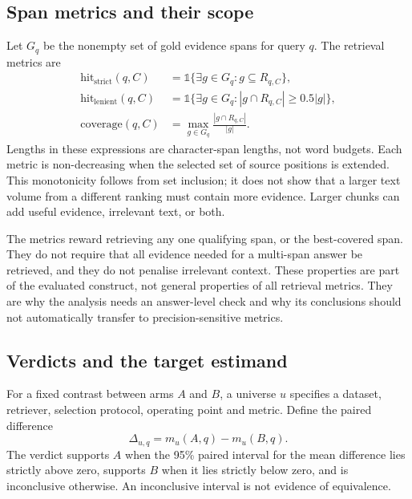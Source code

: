 \documentclass[11pt]{article}
\newcommand{\ind}{\mathbb{1}}
\begin{document}
\subsection{Span metrics and their scope}
Let $G_q$ be the nonempty set of gold evidence spans for query $q$. The retrieval metrics are
\begin{align}
 \mathrm{hit}_{\mathrm{strict}}(q,C)
   &=\ind\{\exists g\in G_q:g\subseteq R_{q,C}\},\\
 \mathrm{hit}_{\mathrm{lenient}}(q,C)
   &=\ind\{\exists g\in G_q:|g\cap R_{q,C}|\geq 0.5|g|\},\\
 \mathrm{coverage}(q,C)
   &=\max_{g\in G_q}\frac{|g\cap R_{q,C}|}{|g|}.
 \label{eq:coverage}
\end{align}
Lengths in these expressions are character-span lengths, not word budgets. Each metric is non-decreasing when the
selected set of source positions is extended. This monotonicity follows from set inclusion; it does not show that a
larger text volume from a different ranking must contain more evidence. Larger chunks can add useful evidence,
irrelevant text, or both.

The metrics reward retrieving any one qualifying span, or the best-covered span. They do not require that all
evidence needed for a multi-span answer be retrieved, and they do not penalise irrelevant context. These properties
are part of the evaluated construct, not general properties of all retrieval metrics. They are why the analysis needs
an answer-level check and why its conclusions should not automatically transfer to precision-sensitive metrics.

\subsection{Verdicts and the target estimand}\label{sec:estimand}
For a fixed contrast between arms $A$ and $B$, a universe $u$ specifies a dataset, retriever, selection protocol,
operating point and metric. Define the paired difference
\begin{equation}
 \Delta_{u,q}=m_u(A,q)-m_u(B,q).
\end{equation}
The verdict supports $A$ when the 95\% paired interval for the mean difference lies strictly above zero, supports $B$
when it lies strictly below zero, and is inconclusive otherwise. An inconclusive interval is not evidence of
equivalence.
\end{document}
